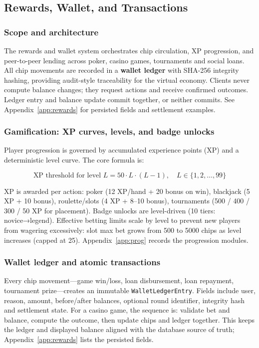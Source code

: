 \documentclass[11pt,a4paper]{article}
\begin{document}
\subsection{Rewards, Wallet, and Transactions}
\label{sec:rewards-banking}

\subsubsection{Scope and architecture}

The rewards and wallet system orchestrates chip circulation, XP progression, and peer-to-peer lending across poker, casino games, tournaments and social loans. All chip movements are recorded in a \textbf{wallet ledger} with SHA-256 integrity hashing, providing audit-style traceability for the virtual economy. Clients never compute balance changes; they request actions and receive confirmed outcomes. Ledger entry and balance update commit together, or neither commits. See Appendix~\ref{app:rewards} for persisted fields and settlement examples.

\subsubsection{Gamification: XP curves, levels, and badge unlocks}

Player progression is governed by accumulated experience points (XP) and a deterministic level curve. The core formula is:

\[
\text{XP threshold for level } L = 50 \cdot L \cdot (L - 1), \quad L \in \{1, 2, \ldots, 99\}
\]

XP is awarded per action: poker (12 XP/hand + 20 bonus on win), blackjack (5 XP + 10 bonus), roulette/slots (4 XP + 8--10 bonus), tournaments (500 / 400 / 300 / 50 XP for placement). Badge unlocks are level-driven (10 tiers: novice→legend). Effective betting limits scale by level to prevent new players from wagering excessively: slot max bet grows from 500 to 5000 chips as level increases (capped at 25). Appendix~\ref{app:prog} records the progression modules.

\subsubsection{Wallet ledger and atomic transactions}

Every chip movement---game win/loss, loan disbursement, loan repayment, tournament prize---creates an immutable \texttt{WalletLedgerEntry}. Fields include user, reason, amount, before/after balances, optional round identifier, integrity hash and settlement state. For a casino game, the sequence is: validate bet and balance, compute the outcome, then update chips and ledger together. This keeps the ledger and displayed balance aligned with the database source of truth; Appendix~\ref{app:rewards} lists the persisted fields.
\end{document}
